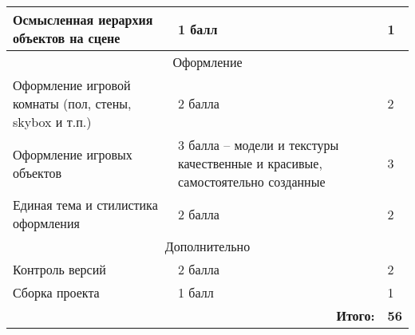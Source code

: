 \begin{tabular}{|p{4cm}|p{9cm}|p{1cm}|}
    Осмысленная иерархия объектов на сцене & 1 балл & 1 \\
    \hline
    \hline

    
    \multicolumn{3}{|c|}{Оформление}	\\
    \hline

    Оформление игровой комнаты (пол, стены, skybox и т.п.) & 2 балла & 2 \\
    \hline

    Оформление игровых объектов & 3 балла -- модели и текстуры качественные и красивые, самостоятельно созданные & 3 \\
    \hline

    Единая тема и стилистика оформления & 2 балла & 2 \\
    \hline

    \multicolumn{3}{|c|}{Дополнительно}	\\
    \hline
	
    Контроль версий & 2 балла & 2 \\
    \hline

    Сборка проекта & 1 балл & 1 \\
    \hline
    \hline

    \multicolumn{2}{|r|}{\textbf{Итого:}}& \textbf{56} \\
    \hline
\end{tabular}